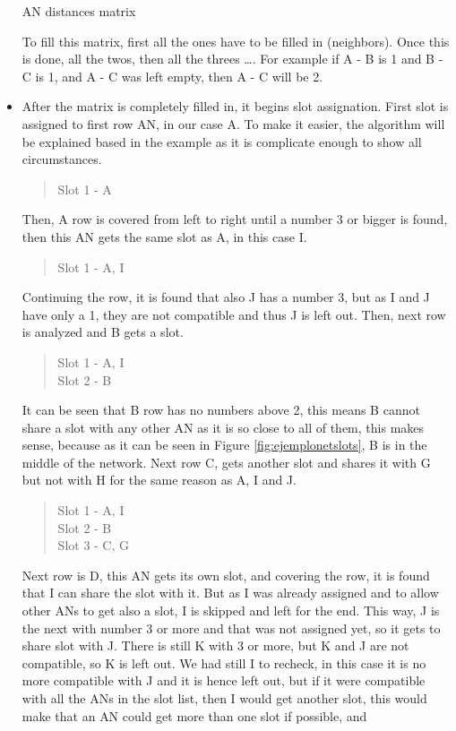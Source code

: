 \begin{itemize}
\begin{table}
\begin{center}
  \caption{\ac{AN} distances matrix}
  \label{tab:neighborsmatrix}
 \end{center}
\end{table}
To fill this matrix, first all the ones have to be filled in (neighbors). Once this is done, all the twos, then all the threes \ldots. For 
example if A - B is 1 and B - C is 1, and A - C was left empty, then A - C will be 2.
 \item After the matrix is completely filled in, it begins slot assignation. First slot is assigned to first row \ac{AN}, in our case A. To 
make it easier, the algorithm will be explained based in the example as it is complicate enough to show all circumstances.
\begin{quote}
 Slot 1 - A
\end{quote}
Then, A row is covered from left to right until a number 3 or bigger is found, then this \ac{AN} gets the same slot as A, in this case I.
\begin{quote}
 Slot 1 - A, I
\end{quote}
Continuing the row, it is found that also J has a number 3, but as I and J have only a 1, they are not compatible and thus J is left out. 
Then, next row is analyzed and B gets a slot.
\begin{quote}
 Slot 1 - A, I \\ Slot 2 - B
\end{quote}
It can be seen that B row has no numbers above 2, this means B cannot share a slot with any other \ac{AN} as it is so close to all of them, 
this makes sense, because as it can be seen in Figure \ref{fig:ejemplonetslots}, B is in the middle of the network. Next row C, gets another
slot and shares it with G but not with H for the same reason as A, I and J.
\begin{quote}
 Slot 1 - A, I \\ Slot 2 - B \\ Slot 3 - C, G
\end{quote}
Next row is D, this \ac{AN} gets its own slot, and covering the row, it is found that I can share the slot with it. But as I was already 
assigned and to allow other \acp{AN} to get also a slot, I is skipped and left for the end. This way, J is the next with number 3 or more 
and that was not assigned yet, so it gets to share slot with J. There is still K with 3 or more, but K and J are not compatible, so K is left out.
We had still I to recheck, in this case it is no more compatible with J and it is hence left out, but if it were compatible with all the 
\acp{AN} in the slot list, then I would get another slot, this would make that an \ac{AN} could get more than one slot if possible, and 

\end{itemize}
